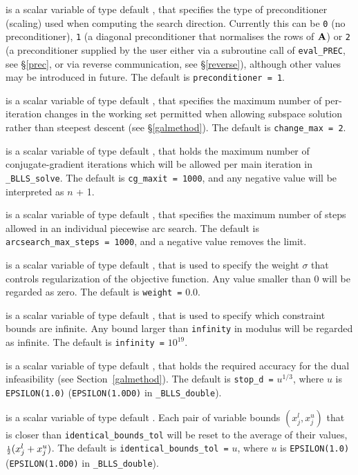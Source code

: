 \documentclass{galahad}
\newcommand{\packagename}{BLLS}
\newcommand{\fullpackagename}{\libraryname\_\packagename}
\newcommand{\solver}{{\tt \fullpackagename\_solve}}
\begin{document}
\begin{description}
 is a scalar variable of type default \integer, that
specifies the type of preconditioner (scaling) used when computing the
search direction. Currently this can be
{\tt 0} (no preconditioner),
{\tt 1} (a diagonal preconditioner that normalises the rows of ${\mathbf{A}}$) or
{\tt 2} (a preconditioner supplied by the user either via a subroutine
call of {\tt eval\_PREC}, see \S\ref{prec}, or via reverse communication,
see \S\ref{reverse}),
although other values may be introduced
in future. The default is {\tt preconditioner = 1}.

 is a scalar variable of type default \integer, that
specifies the maximum number of per-iteration changes in the working set
permitted when allowing subspace solution rather than steepest descent
(see \S\ref{galmethod}).
The default is {\tt change\_max = 2}.

 is a scalar variable of type default \integer, that holds the
maximum number of conjugate-gradient iterations which will be allowed
per main iteration in \solver.
The default is {\tt cg\_maxit = 1000}, and any negative value will
be interpreted as $n$ + 1.

 is a scalar variable of type default \integer,
that specifies the maximum number of steps allowed in an individual
piecewise arc search.
The default is {\tt arcsearch\_max\_steps = 1000}, and a negative value
removes the limit.

 is a scalar variable of type default \realdp, that is used to
specify the weight $\sigma$ that controls regularization of the objective
function. Any value smaller than $0$ will be regarded as zero.
The default is {\tt weight =} $0.0$.

 is a scalar variable of type default \realdp, that is used to
specify which constraint bounds are infinite.
Any bound larger than {\tt infinity} in modulus will be regarded as infinite.
The default is {\tt infinity =} $10^{19}$.

 is a scalar variable of type default
\realdp, that holds the
required accuracy for the dual infeasibility (see Section~\ref{galmethod}).
The default is {\tt stop\_d =} $u^{1/3}$,
where $u$ is {\tt EPSILON(1.0)} ({\tt EPSILON(1.0D0)} in
{\tt \fullpackagename\_double}).

is a scalar variable of type default \realdp.
Each pair of variable bounds $(x_{j}^{l}, x_{j}^{u})$
that is closer than {\tt identical\_bounds\_tol}
will be reset to the average of their values,
${\scriptstyle \frac{1}{2}} (x_{j}^{l} + x_{j}^{u})$.
The default is {\tt identical\_bounds\_tol =} $u$,
where $u$ is {\tt EPSILON(1.0)} ({\tt EPSILON(1.0D0)} in
{\tt \fullpackagename\_double}).


\end{description}
\end{document}
